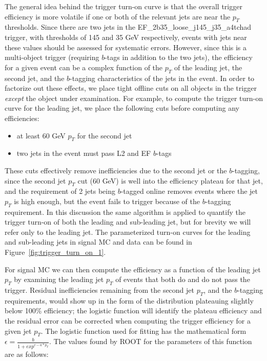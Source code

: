 The general idea behind the trigger turn-on curve is that the overall trigger efficiency
is more volatile if one or both of the relevant jets are near the $p_T$ thresholds.
Since there are two jets in the EF\_2b35\_loose\_j145\_j35\_a4tchad trigger, with thresholds
of 145 and 35 GeV respectively, events with jets near these values should be assessed
for systematic errors.  However, since this is a multi-object trigger (requiring $b$-tags
in addition to the two jets), the efficiency for a given event can be a complex function
of the $p_T$ of the leading jet, the second jet, and the $b$-tagging characteristics of
the jets in the event.  In order to factorize out these effects, we place tight offline
cuts on all objects in the trigger \textit{except} the object under examination. For example, 
to compute the trigger turn-on curve for the leading jet, we place the following cuts before
computing any efficiencies: 
\begin{itemize}
    \item at least 60 GeV $p_T$ for the second jet
    \item two jets in the event must pass L2 and EF $b$-tags
\end{itemize}

These cuts effectively remove inefficiencies due to the second jet or the $b$-tagging,
since the second jet $p_T$ cut (60 GeV) is well into the efficiency plateau for that
jet, and the requirement of 2 jets being $b$-tagged online removes events where the
jet $p_T$ is high enough, but the event fails to trigger because of the $b$-tagging requirement.  
In this discussion the same algorithm is applied to quantify
the trigger turn-on of both the leading and sub-leading jet, but for brevity we will
refer only to the leading jet.  The parameterized turn-on curves for the leading and 
sub-leading jets in signal MC and data can be found in Figure~\ref{fig:trigger_turn_on_1}.

For signal MC we can then compute the efficiency as a function of the leading jet $p_T$ by
examining the leading jet $p_T$ of events that both do and do not pass the trigger.
Residual inefficiencies remaining from the second jet $p_T$, and the $b$-tagging requirements,
would show up in the form of the distribution plateauing slightly below 100\% efficiency;
the logistic function will identify the plateau efficiency and the residual error can be corrected when
computing the trigger efficiency for a given jet $p_T$.  The logistic function used for 
fitting has the mathematical form $\epsilon = \frac{b}{1+exp^{c-a*p_T}}$.  The values found
by ROOT for the parameters of this function are as follows:

